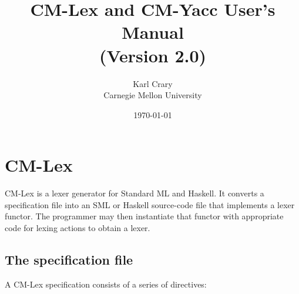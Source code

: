 \documentclass[10pt]{article}
\title{CM-Lex and CM-Yacc User's Manual \\ \Large
(Version 2.0)}
\author{Karl Crary \\ Carnegie Mellon University}
\date{\today}
\begin{document}
\maketitle

\section{CM-Lex}

CM-Lex is a lexer generator for Standard ML and Haskell.  It converts
a specification file into an SML or Haskell source-code file that
implements a lexer functor.  The programmer may then instantiate that
functor with appropriate code for lexing actions to obtain a lexer.

\subsection{The specification file}

A CM-Lex specification consists of a series of directives:
\end{document}
